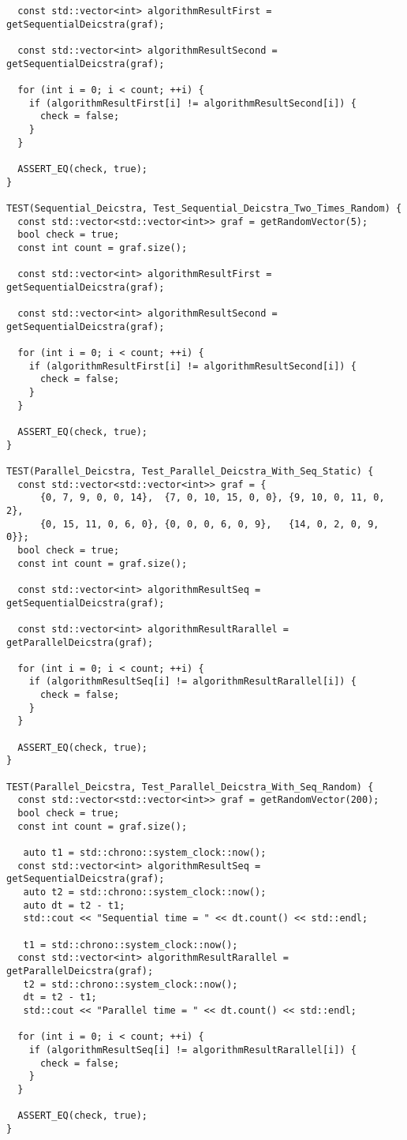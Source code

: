 \documentclass{report}
\begin{document}
\begin{lstlisting}
  const std::vector<int> algorithmResultFirst = getSequentialDeicstra(graf);

  const std::vector<int> algorithmResultSecond = getSequentialDeicstra(graf);

  for (int i = 0; i < count; ++i) {
    if (algorithmResultFirst[i] != algorithmResultSecond[i]) {
      check = false;
    }
  }

  ASSERT_EQ(check, true);
}

TEST(Sequential_Deicstra, Test_Sequential_Deicstra_Two_Times_Random) {
  const std::vector<std::vector<int>> graf = getRandomVector(5);
  bool check = true;
  const int count = graf.size();

  const std::vector<int> algorithmResultFirst = getSequentialDeicstra(graf);

  const std::vector<int> algorithmResultSecond = getSequentialDeicstra(graf);

  for (int i = 0; i < count; ++i) {
    if (algorithmResultFirst[i] != algorithmResultSecond[i]) {
      check = false;
    }
  }

  ASSERT_EQ(check, true);
}

TEST(Parallel_Deicstra, Test_Parallel_Deicstra_With_Seq_Static) {
  const std::vector<std::vector<int>> graf = {
      {0, 7, 9, 0, 0, 14},  {7, 0, 10, 15, 0, 0}, {9, 10, 0, 11, 0, 2},
      {0, 15, 11, 0, 6, 0}, {0, 0, 0, 6, 0, 9},   {14, 0, 2, 0, 9, 0}};
  bool check = true;
  const int count = graf.size();

  const std::vector<int> algorithmResultSeq = getSequentialDeicstra(graf);

  const std::vector<int> algorithmResultRarallel = getParallelDeicstra(graf);

  for (int i = 0; i < count; ++i) {
    if (algorithmResultSeq[i] != algorithmResultRarallel[i]) {
      check = false;
    }
  }

  ASSERT_EQ(check, true);
}

TEST(Parallel_Deicstra, Test_Parallel_Deicstra_With_Seq_Random) {
  const std::vector<std::vector<int>> graf = getRandomVector(200);
  bool check = true;
  const int count = graf.size();

   auto t1 = std::chrono::system_clock::now();
  const std::vector<int> algorithmResultSeq = getSequentialDeicstra(graf);
   auto t2 = std::chrono::system_clock::now();
   auto dt = t2 - t1;
   std::cout << "Sequential time = " << dt.count() << std::endl;

   t1 = std::chrono::system_clock::now();
  const std::vector<int> algorithmResultRarallel = getParallelDeicstra(graf);
   t2 = std::chrono::system_clock::now();
   dt = t2 - t1;
   std::cout << "Parallel time = " << dt.count() << std::endl;

  for (int i = 0; i < count; ++i) {
    if (algorithmResultSeq[i] != algorithmResultRarallel[i]) {
      check = false;
    }
  }

  ASSERT_EQ(check, true);
}

\end{lstlisting}
\end{document}
